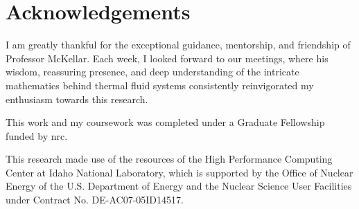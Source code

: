    \chapter{Acknowledgements}
   I am greatly thankful for the exceptional guidance, mentorship, and friendship of Professor McKellar. Each week, I looked forward to our meetings, where his wisdom, reassuring presence, and deep understanding of the intricate mathematics behind thermal fluid systems consistently reinvigorated my enthusiasm towards this research.

   

   This work and my coursework was completed under a Graduate Fellowship funded by \acf{nrc}.
   
   This research made use of the resources of the High Performance Computing Center at Idaho National Laboratory, which is supported by the Office of Nuclear Energy of the U.S. Department of Energy and the Nuclear Science User Facilities under Contract No. DE-AC07-05ID14517.

